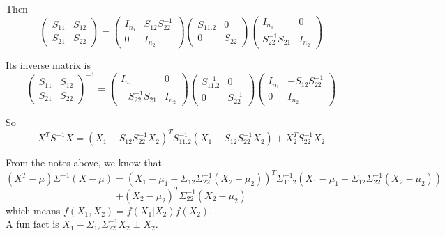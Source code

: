\documentclass[12pt]{book}
\theoremstyle{definition}
\theoremstyle{remark}
\begin{document}
\begin{notionbox}[Note]
Then
\[
\begin{pmatrix}
S_{11} & S_{12} \\
S_{21} & S_{22}
\end{pmatrix}
=
\begin{pmatrix}
I_{n_1} & S_{12} S_{22}^{-1} \\
0 & I_{n_2}
\end{pmatrix}
\begin{pmatrix}
S_{11.2} & 0 \\
0 & S_{22}
\end{pmatrix}
\begin{pmatrix}
I_{n_1} & 0 \\
S_{22}^{-1} S_{21} & I_{n_2}
\end{pmatrix}
\]

Its inverse matrix is 
\[\begin{pmatrix}S_{11} & S_{12} \\
S_{21} & S_{22}\end{pmatrix}^{-1}=
\begin{pmatrix}I_{n_1} & 0 \\
-S_{22}^{-1} S_{21} & I_{n_2}\end{pmatrix}
\begin{pmatrix}S_{11.2}^{-1} & 0 \\
0 & S_{22}^{-1}\end{pmatrix}
\begin{pmatrix}I_{n_1} & -S_{12} S_{22}^{-1} \\
0 & I_{n_2}\end{pmatrix}\]

So
\[X^T S^{-1} X = (X_1 - S_{12} S_{22}^{-1} X_2)^T S_{11.2}^{-1} (X_1 - S_{12} S_{22}^{-1} X_2) + X_2^T S_{22}^{-1} X_2\]
\end{notionbox}
From the notes above, we know that 
\[(X^T-\mu) \Sigma^{-1} (X-\mu) = (X_1 -\mu_1- \Sigma_{12} \Sigma_{22}^{-1} (X_2-\mu_2))^T \Sigma_{11.2}^{-1}  (X_1 -\mu_1- \Sigma_{12} \Sigma_{22}^{-1} (X_2-\mu_2))\]\[ + (X_2-\mu_2)^T \Sigma_{22}^{-1}(X_2-\mu_2)\]
which means $f(X_1, X_2) = f(X_1|X_2)f(X_2)$.\\

A fun fact is $X_1 - \Sigma_{12} \Sigma_{22}^{-1}X_2 \perp X_2$.\\
\end{document}
